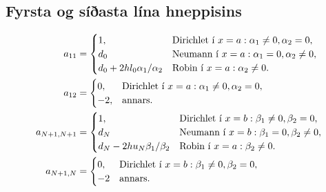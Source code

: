 \documentclass[letterpaper,10pt,icelandic]{sphinxmanual}
\begin{document}
\subsection{Fyrsta og síðasta lína hneppisins}
\label{kafli07:fyrsta-og-siasta-lina-hneppisins}\begin{gather}
\begin{split}\begin{aligned}
a_{11}&=
\begin{cases}
  1,&\text{Dirichlet í } x=a: \alpha_1\neq 0, \alpha_2=0,\\
d_0&\text{Neumann í } x=a:  \alpha_1=0, \alpha_2\neq 0,\\
d_0+2hl_0\alpha_1/\alpha_2&\text{Robin í } x=a:  \alpha_2\neq 0.
\end{cases} \\
a_{12}&=
\begin{cases}
  0,&\text{Dirichlet í } x=a: \alpha_1\neq 0, \alpha_2=0,\\
-2,&\text{annars}.
\end{cases}
\\
a_{N+1,N+1}&=
\begin{cases}
  1,&\text{Dirichlet í } x=b: \beta_1\neq 0, \beta_2=0,\\
d_N&\text{Neumann í } x=b:  \beta_1=0, \beta_2\neq 0,\\
d_N-2hu_N\beta_1/\beta_2&\text{Robin í } x=a:  \beta_2\neq 0.
\end{cases}
\\
a_{N+1,N}&=
\begin{cases}
  0,&\text{Dirichlet í } x=b: \beta_1\neq 0, \beta_2=0,\\
-2&\text{annars}.
\end{cases}
  \end{aligned}\end{split}\notag
\end{gather}
\end{document}
